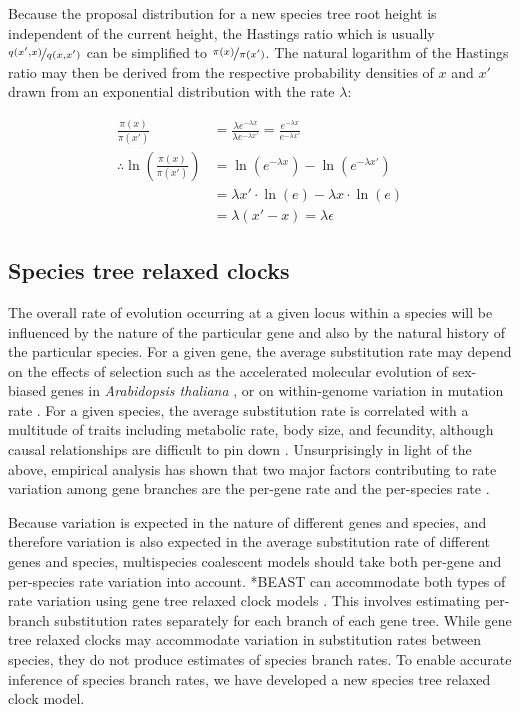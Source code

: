 \documentclass[nogrid]{MBE}%
\begin{document}
Because the proposal distribution for a new species tree root height is
independent of the current height, the Hastings ratio which is usually
$\nicefrac{q(x',x)}{q(x,x')}$ \citep{Hastings1970} can be simplified to
$\nicefrac{\pi(x)}{\pi(x')}$. The natural logarithm of the Hastings ratio may then
be derived from the respective probability densities of $x$ and
$x'$ drawn from an exponential distribution with the rate $\lambda$:

\begin{align}
\frac{\pi(x)}{\pi(x')} &= \frac{\lambda e^{-\lambda x}}{\lambda e^{-\lambda x'}} = \frac{e^{-\lambda x}}{e^{-\lambda x'}}\\
\therefore \ln\left(\frac{\pi(x)}{\pi(x')}\right) &= \ln \left(e^{-\lambda x}\right) - \ln \left(e^{-\lambda x'}\right)\\
& = \lambda x' \cdot \ln \left(e\right) - \lambda x \cdot \ln \left(e\right)\\
& = \lambda \left(x' - x\right) = \lambda \epsilon
\end{align}

\subsection{Species tree relaxed clocks}

The overall rate of evolution occurring at a given locus within a species will
be influenced by the nature of the particular gene and also by the natural
history of the particular species. For a given gene, the average substitution
rate may depend on the effects of selection such as the accelerated molecular
evolution of sex-biased genes in \textit{Arabidopsis thaliana}
\citep{Gossmann01032014}, or on within-genome variation in mutation rate \citep{Baer2007}.
For a given species, the average substitution rate is correlated with a
multitude of traits including metabolic rate, body size, and fecundity, although
causal relationships are difficult to pin down \citep{Bromham2503}.
Unsurprisingly in light of the above, empirical analysis has shown that two
major factors contributing to rate variation among gene branches are the
per-gene rate and the per-species rate \citep{Rasmussen01122007}.

Because variation is expected in the nature of different genes and species, and
therefore variation is also expected in the average substitution rate of different
genes and species, multispecies coalescent models should take both per-gene and
per-species rate variation into account. *BEAST can accommodate both types of
rate variation using gene tree relaxed clock models \citep[for examples see][]{Berv2014120, Lambert2015146}.
This involves estimating per-branch substitution rates separately
for each branch of each gene tree. While gene tree relaxed clocks may
accommodate variation in substitution rates between species, they do not produce
estimates of species branch rates. To enable accurate inference of species
branch rates, we have developed a new species tree relaxed clock model.
\end{document}

